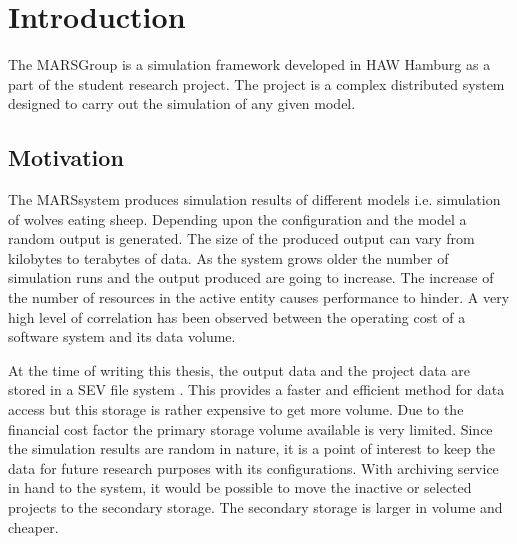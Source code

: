 \newpage
\chapter{Introduction}

The MARS\footnotemark Group  is a simulation framework developed 
in HAW Hamburg as a  part of the student research project. The project is a complex 
distributed system designed to carry  out the simulation of any given model. 
\cite{HAWHamburgMARS}
    \section{Motivation}
    The MARS\footnotemark[\value{footnote}] system produces simulation results of 
    different models i.e. simulation of wolves eating sheep. Depending upon the 
    configuration and the model a random output is generated. The size of the produced
    output can vary from kilobytes to terabytes of data. As the system grows older the 
    number of simulation runs and the output produced are going to increase. The increase
    of the number of resources in the active entity causes performance to hinder. 
    A very high level of correlation has been observed between the operating cost of a software 
    system and its data volume. 
    
    
    \par

    At the time of writing this thesis, the output data and the project data are stored in a
    SEV file system \cite{SEV}. This provides a faster and efficient method for data
    access but this storage is rather expensive to get more volume. Due to the financial cost 
    factor the primary storage volume available is very limited. Since the simulation 
    results are random in nature, it is a point of interest to keep the data for future
    research purposes with its configurations. With archiving service in hand to the system, 
    it would be possible to move the inactive or selected projects to the secondary storage. 
    The secondary storage is larger in volume and cheaper. 
    
    \par

